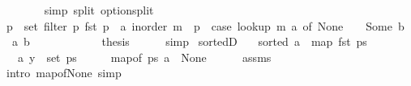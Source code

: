 \begin{isabellebody}
\ \ \ \ \ \ \isamarkupfalse%
\ {\isacharparenleft}{\kern0pt}simp\ split{\isacharcolon}{\kern0pt}\ option{\isachardot}{\kern0pt}split{\isacharparenright}{\kern0pt}\isanewline
\ \ \ \ \isamarkupfalse%
\ \isamarkupfalse%
\ {\isachardoublequoteopen}p\ {\isasymin}\ set\ {\isacharparenleft}{\kern0pt}filter\ {\isacharparenleft}{\kern0pt}{\isasymlambda}p{\isachardot}{\kern0pt}\ fst\ p\ {\isacharequal}{\kern0pt}\ a{\isacharparenright}{\kern0pt}\ {\isacharparenleft}{\kern0pt}inorder\ m{\isacharparenright}{\kern0pt}{\isacharparenright}{\kern0pt}\ {\isasymlongleftrightarrow}\ p\ {\isasymin}\ {\isacharparenleft}{\kern0pt}case\ lookup\ m\ a\ of\ None\ {\isasymRightarrow}\ {\isacharbraceleft}{\kern0pt}{\isacharbraceright}{\kern0pt}\ {\isacharbar}{\kern0pt}\ Some\ b\ {\isasymRightarrow}\ {\isacharbraceleft}{\kern0pt}{\isacharparenleft}{\kern0pt}a{\isacharcomma}{\kern0pt}\ b{\isacharparenright}{\kern0pt}{\isacharbraceright}{\kern0pt}{\isacharparenright}{\kern0pt}{\isachardoublequoteclose}\isanewline
\ \ \ \ \ \ \isacommand{{\isachardot}{\kern0pt}}\isamarkupfalse%
\ \isacommand{{\isacharbraceright}{\kern0pt}}\isamarkupfalse%
\isanewline
\ \ \isamarkupfalse%
\ {\isacharquery}{\kern0pt}thesis\isanewline
\ \ \ \ \isamarkupfalse%
\ simp\isanewline
{}\isamarkupfalse%
%
\endisatagproof
{\isafoldproof}%
%
\isadelimproof
\isanewline
%
\endisadelimproof
%
\isadeliminvisible
\isanewline
%
\endisadeliminvisible
%
\isataginvisible
{}\isamarkupfalse%
\ sorted{}D{\isacharcolon}{\kern0pt}\isanewline
\ \ \ {\isachardoublequoteopen}sorted\ {\isacharparenleft}{\kern0pt}a\ {\isacharhash}{\kern0pt}\ map\ fst\ ps{\isacharparenright}{\kern0pt}{\isachardoublequoteclose}\isanewline
\ \ \ {\isachardoublequoteopen}{\isacharparenleft}{\kern0pt}a{\isacharcomma}{\kern0pt}\ y{\isacharparenright}{\kern0pt}\ {\isasymnotin}\ set\ ps{\isachardoublequoteclose}%
\endisataginvisible
{\isafoldinvisible}%
%
\isadeliminvisible
\isanewline
%
\endisadeliminvisible
%
\isadelimproof
%
\endisadelimproof
%
\isatagproof
{}\isamarkupfalse%
\ {\isacharminus}{\kern0pt}\isanewline
\ \ \isamarkupfalse%
\ {\isachardoublequoteopen}map{\isacharunderscore}{\kern0pt}of\ ps\ a\ {\isacharequal}{\kern0pt}\ None{\isachardoublequoteclose}\isanewline
\ \ \ \ \isamarkupfalse%
\ assms\isanewline
\ \ \ \ \isamarkupfalse%
\ {\isacharparenleft}{\kern0pt}intro\ map{\isacharunderscore}{\kern0pt}of{\isacharunderscore}{\kern0pt}None{\isacharparenright}{\kern0pt}\ simp\isanewline

\end{isabellebody}
